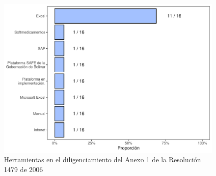 \documentclass[
]{book}
\begin{document}
\begin{figure}
\includegraphics[width=0.85\linewidth]{InformeFinal_files/figure-latex/HerramientasDiligA1-1} \caption{Herramientas en el diligenciamiento del Anexo 1 de la Resolución 1479 de 2006}\label{fig:HerramientasDiligA1}
\end{figure}
\end{document}
